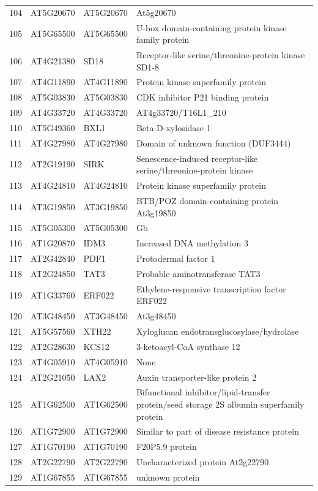 \documentclass[11pt]{article}
\begin{document}
\begin{center}
\begin{tabular}{rlll}
104 & AT5G20670 & AT5G20670 & At5g20670\\
105 & AT5G65500 & AT5G65500 & U-box domain-containing protein kinase family protein\\
106 & AT4G21380 & SD18 & Receptor-like serine/threonine-protein kinase SD1-8\\
107 & AT4G11890 & AT4G11890 & Protein kinase superfamily protein\\
108 & AT5G03830 & AT5G03830 & CDK inhibitor P21 binding protein\\
109 & AT4G33720 & AT4G33720 & AT4g33720/T16L1\_210\\
110 & AT5G49360 & BXL1 & Beta-D-xylosidase 1\\
111 & AT4G27980 & AT4G27980 & Domain of unknown function (DUF3444)\\
112 & AT2G19190 & SIRK & Senescence-induced receptor-like serine/threonine-protein kinase\\
113 & AT4G24810 & AT4G24810 & Protein kinase superfamily protein\\
114 & AT3G19850 & AT3G19850 & BTB/POZ domain-containing protein At3g19850\\
115 & AT5G05300 & AT5G05300 & Gb\\
116 & AT1G20870 & IDM3 & Increased DNA methylation 3\\
117 & AT2G42840 & PDF1 & Protodermal factor 1\\
118 & AT2G24850 & TAT3 & Probable aminotransferase TAT3\\
119 & AT1G33760 & ERF022 & Ethylene-responsive transcription factor ERF022\\
120 & AT3G48450 & AT3G48450 & At3g48450\\
121 & AT5G57560 & XTH22 & Xyloglucan endotransglucosylase/hydrolase\\
122 & AT2G28630 & KCS12 & 3-ketoacyl-CoA synthase 12\\
123 & AT4G05910 & AT4G05910 & None\\
124 & AT2G21050 & LAX2 & Auxin transporter-like protein 2\\
125 & AT1G62500 & AT1G62500 & Bifunctional inhibitor/lipid-transfer protein/seed storage 2S albumin superfamily protein\\
126 & AT1G72900 & AT1G72900 & Similar to part of disease resistance protein\\
127 & AT1G70190 & AT1G70190 & F20P5.9 protein\\
128 & AT2G22790 & AT2G22790 & Uncharacterized protein At2g22790\\
129 & AT1G67855 & AT1G67855 & unknown protein\\

\end{tabular}
\end{center}
\end{document}
